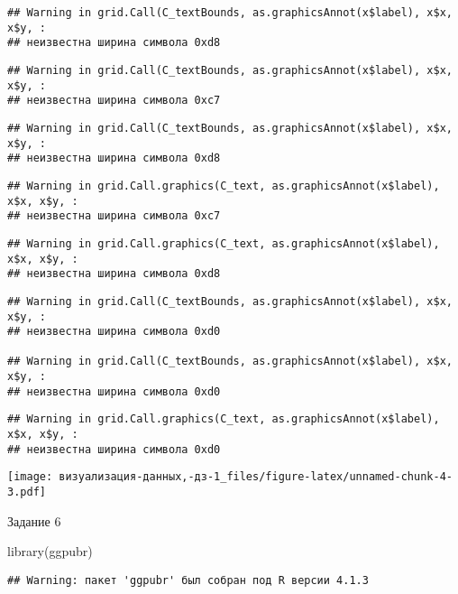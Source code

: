 \documentclass[
]{article}
\newenvironment{Shaded}{\begin{snugshade}}{\end{snugshade}}
\newcommand{\FunctionTok}[1]{\textcolor[rgb]{0.00,0.00,0.00}{#1}}
\newcommand{\NormalTok}[1]{#1}
\begin{document}
\begin{verbatim}
## Warning in grid.Call(C_textBounds, as.graphicsAnnot(x$label), x$x, x$y, :
## неизвестна ширина символа 0xd8
\end{verbatim}

\begin{verbatim}
## Warning in grid.Call(C_textBounds, as.graphicsAnnot(x$label), x$x, x$y, :
## неизвестна ширина символа 0xc7
\end{verbatim}

\begin{verbatim}
## Warning in grid.Call(C_textBounds, as.graphicsAnnot(x$label), x$x, x$y, :
## неизвестна ширина символа 0xd8
\end{verbatim}

\begin{verbatim}
## Warning in grid.Call.graphics(C_text, as.graphicsAnnot(x$label), x$x, x$y, :
## неизвестна ширина символа 0xc7
\end{verbatim}

\begin{verbatim}
## Warning in grid.Call.graphics(C_text, as.graphicsAnnot(x$label), x$x, x$y, :
## неизвестна ширина символа 0xd8
\end{verbatim}

\begin{verbatim}
## Warning in grid.Call(C_textBounds, as.graphicsAnnot(x$label), x$x, x$y, :
## неизвестна ширина символа 0xd0

## Warning in grid.Call(C_textBounds, as.graphicsAnnot(x$label), x$x, x$y, :
## неизвестна ширина символа 0xd0
\end{verbatim}

\begin{verbatim}
## Warning in grid.Call.graphics(C_text, as.graphicsAnnot(x$label), x$x, x$y, :
## неизвестна ширина символа 0xd0
\end{verbatim}

\texttt{[image: визуализация-данных,-дз-1\_files/figure-latex/unnamed-chunk-4-3.pdf]}

Задание 6

\begin{Shaded}
\begin{Highlighting}[]
\FunctionTok{library}\NormalTok{(ggpubr)}
\end{Highlighting}
\end{Shaded}

\begin{verbatim}
## Warning: пакет 'ggpubr' был собран под R версии 4.1.3
\end{verbatim}
\end{document}
